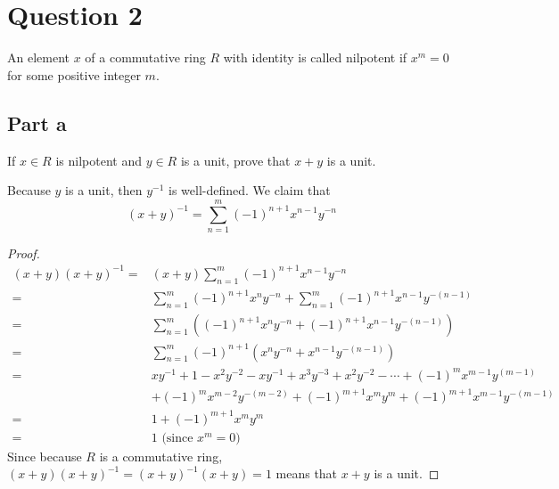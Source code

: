 \section{Question 2}

\begin{question}
    An element $x$ of a commutative ring $R$ with identity is called nilpotent if $x^m=0$ for some positive integer $m$.
\end{question}

\subsection{Part a}

\begin{question}
    If $x \in R$ is nilpotent and $y \in R$ is a unit, prove that $x+y$ is a unit.
\end{question}

\begin{answer}
    Because $y$ is a unit, then $y^{-1}$ is well-defined. We claim that $$(x+y)^{-1} = \sum_{n = 1}^{m}(-1)^{n+1}x^{n-1}y^{-n}$$
    \begin{proof}
        \begin{equation}
            \begin{aligned}
                (x+y)(x+y)^{-1} =& (x+y)\sum_{n = 1}^{m}(-1)^{n+1}x^{n-1}y^{-n}\\
                =& \sum_{n = 1}^{m}(-1)^{n+1}x^{n}y^{-n} + \sum_{n = 1}^{m}(-1)^{n+1}x^{n-1}y^{-(n-1)}\\
                =& \sum_{n = 1}^{m}\left((-1)^{n+1}x^{n}y^{-n}+(-1)^{n+1}x^{n-1}y^{-(n-1)}\right)\\
                =& \sum_{n = 1}^{m}(-1)^{n+1}\left(x^{n}y^{-n}+x^{n-1}y^{-(n-1)}\right)\\
                =& xy^{-1} + 1 - x^2y^{-2} - xy^{-1} + x^{3}y^{-3} + x^2y^{-2} - \cdots + (-1)^{m}x^{m-1}y^{(m-1)}\\
                &+ (-1)^{m}x^{m-2}y^{-(m-2)} + (-1)^{m+1}x^{m}y^{m} + (-1)^{m+1}x^{m-1}y^{-(m-1)}\\
                =& 1 + (-1)^{m+1}x^{m}y^{m}\\
                =& 1 \text{ (since $x^m = 0$)}
            \end{aligned}
        \end{equation}
        Since because $R$ is a commutative ring, $(x+y)(x+y)^{-1} = (x+y)^{-1}(x+y) = 1$ means that $x+y$ is a unit.
    \end{proof}
\end{answer}

